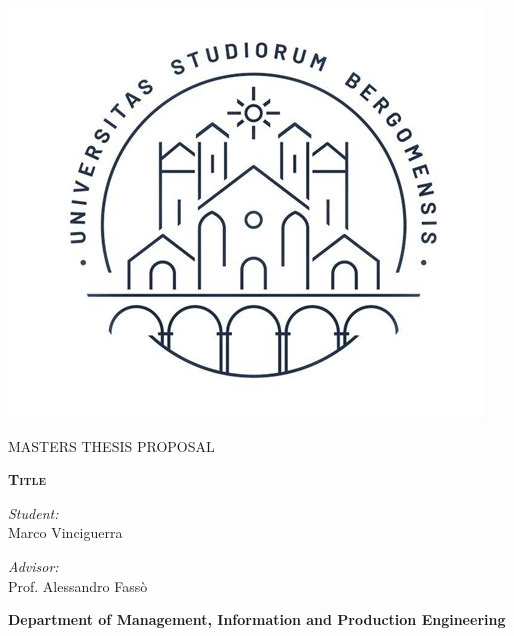 \documentclass[a4, 12pt]{article}
\begin{document}
\begin{titlepage}

\begin{center}
   \includegraphics[scale=0.25]{Images/th.jpeg} 
\end{center}
   
\thispagestyle{fancy}

\center

\textsc{\large MASTERS THESIS PROPOSAL}

\vspace{0.5in}

\noindent\makebox[\linewidth]{\rule{\linewidth}{1.2pt}}
\textsc{ \textbf{\large Title }}
\noindent\makebox[\linewidth]{\rule{\linewidth}{1.2pt}}

\vspace{0.5in}

\begin{minipage}{0.48\textwidth}
    \begin{flushleft}
        \textit{Student:} \\
        Marco Vinciguerra \\
       
    \end{flushleft}
\end{minipage}
\begin{minipage}{0.48\textwidth}
    \begin{flushright}
    \textit{Advisor:} \\
    Prof. Alessandro Fassò\\
    \end{flushright}
\end{minipage}

\vspace{2in}

\textbf{\large Department of Management, Information and Production Engineering} \\


\end{titlepage}

\newpage

\setcounter{page}{2}
\tableofcontents
\newpage







\end{document}
